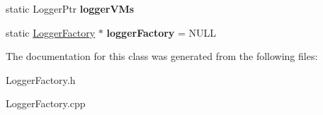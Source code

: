 \begin{DoxyCompactItemize}
\item 
\hypertarget{classLoggerFactory_a7cd5a5202a78bb503df1be06660381be}{static \-Logger\-Ptr {\bfseries logger\-V\-Ms}}\label{classLoggerFactory_a7cd5a5202a78bb503df1be06660381be}

\item 
\hypertarget{classLoggerFactory_a8454b6c224c43f33feff71379c2e859e}{static \hyperlink{classLoggerFactory}{\-Logger\-Factory} $\ast$ {\bfseries logger\-Factory} = \-N\-U\-L\-L}\label{classLoggerFactory_a8454b6c224c43f33feff71379c2e859e}

\end{DoxyCompactItemize}


\-The documentation for this class was generated from the following files\-:\begin{DoxyCompactItemize}
\item 
\-Logger\-Factory.\-h\item 
\-Logger\-Factory.\-cpp\end{DoxyCompactItemize}
